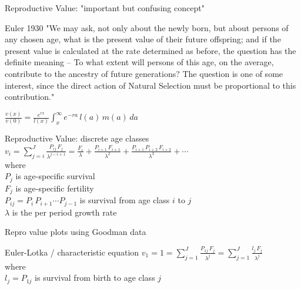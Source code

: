 \documentclass{beamer}
\begin{document}
\begin{frame}{Reproductive Value: "important but confusing concept"}
\begin{block}{Euler 1930}
"We may ask, not only about the newly born, but about persons of any chosen age, what is the present value of their future offspring; and if the present value is calculated at the rate determined as before, the question has the definite meaning -- To what extent will persons of this age, on the average, contribute to the ancestry of future generations? The question is one of some interest, since the direct action of Natural Selection must be proportional to this contribution."
\end{block}
\vspace{.5cm}
\pause
$\frac{v(x)}{v(0)} = \frac{e^{rx}}{l(x)} \int_{x}^{\infty} e^{-ra} \, l(a) \, m(a) \, da$
\end{frame}

\begin{frame}{Reproductive Value: discrete age classes}
  $v_i =  \displaystyle\sum\limits_{j=i}^{J} \frac{P_{ij} \, F_j}{\lambda^{j-i+1}} = \frac{F_i}{\lambda} + \frac{P_{i+1} \, F_{i+1}}{\lambda^2} + \frac{P_{i+1} \, P_{i+2} \, F_{i+2}}{\lambda^3} + \cdots$\\
  \vspace{.5cm}
  where\\
  \vspace{.5cm}
  $P_j$ is age-specific survival\\
  \vspace{.5cm}
  $F_j$ is age-specific fertility\\
  \vspace{.5cm}
  $P_{ij} = P_i \, P_{i+1} \cdots P_{j-1}$ is survival from age class $i$ to $j$\\
  \vspace{.5cm}
  $\lambda$ is the per period growth rate\\
\end{frame}

\begin{frame}{Repro value plots using Goodman data}
\end{frame}

\begin{frame}{Euler-Lotka / characteristic equation}
  $v_1 = 1 = \displaystyle\sum\limits_{j=1}^{J} \frac{P_{1j} \, F_j}{\lambda^j} = \displaystyle\sum\limits_{j=1}^{J} \frac{l_j \, F_j}{\lambda^j}$\\
\vspace{.5cm}
where\\
\vspace{.5cm}
  $l_j = P_{1j}$ is survival from birth to age class $j$\\
\end{frame}
\end{document}

